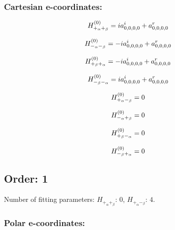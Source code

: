 \documentclass[fleqn]{article}
\begin{document}
\subsubsection*{Cartesian e-coordinates:}

\begin{dmath*}
H_{+_{\alpha}+_{\beta}}^{(0)}= i a^{i}_{0,0,0,0} + a^{r}_{0,0,0,0}\\
\end{dmath*}

\begin{dmath*}
H_{-_{\alpha}-_{\beta}}^{(0)}=-  i a^{i}_{0,0,0,0} + a^{r}_{0,0,0,0}\\
\end{dmath*}

\begin{dmath*}
H_{+_{\beta}+_{\alpha}}^{(0)}=-  i a^{i}_{0,0,0,0} + a^{r}_{0,0,0,0}\\
\end{dmath*}

\begin{dmath*}
H_{-_{\beta}-_{\alpha}}^{(0)}= i a^{i}_{0,0,0,0} + a^{r}_{0,0,0,0}\\
\end{dmath*}

\begin{dmath*}
H_{+_{\alpha}-_{\beta}}^{(0)}=0\\
\end{dmath*}

\begin{dmath*}
H_{-_{\alpha}+_{\beta}}^{(0)}=0\\
\end{dmath*}

\begin{dmath*}
H_{+_{\beta}-_{\alpha}}^{(0)}=0\\
\end{dmath*}

\begin{dmath*}
H_{-_{\beta}+_{\alpha}}^{(0)}=0\\
\end{dmath*}
\subsection{Order: 1}
Number of fitting parameters: $H_{+_{\alpha}+_{\beta}}$: $0$, $H_{+_{\alpha}-_{\beta}}$: $4$.
\subsubsection*{Polar e-coordinates:}
\end{document}

